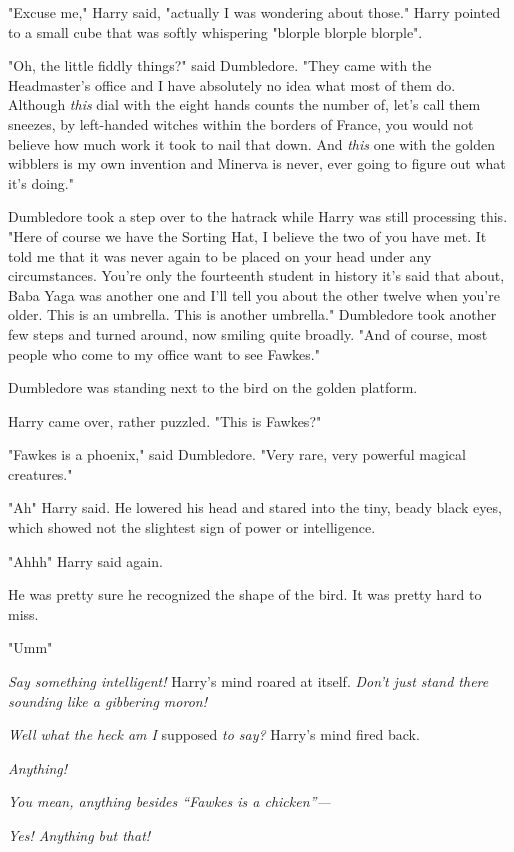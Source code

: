 "Excuse me," Harry said, "actually I was wondering about those." Harry pointed
to a small cube that was softly whispering "blorple{\el} blorple{\el}
blorple".

"Oh, the little fiddly things?" said Dumbledore. "They came with the
Headmaster's office and I have absolutely no idea what most of them do.
Although \emph{this} dial with the eight hands counts the number of, let's call
them sneezes, by left-handed witches within the borders of France, you would
not believe how much work it took to nail that down. And \emph{this} one with
the golden wibblers is my own invention and Minerva is never, ever going to
figure out what it's doing."

Dumbledore took a step over to the hatrack while Harry was still processing
this. "Here of course we have the Sorting Hat, I believe the two of you have
met. It told me that it was never again to be placed on your head under any
circumstances. You're only the fourteenth student in history it's said that
about, Baba Yaga was another one and I'll tell you about the other twelve when
you're older. This is an umbrella. This is another umbrella." Dumbledore took
another few steps and turned around, now smiling quite broadly. "And of course,
most people who come to my office want to see Fawkes."

Dumbledore was standing next to the bird on the golden platform.

Harry came over, rather puzzled. "This is Fawkes?"

"Fawkes is a phoenix," said Dumbledore. "Very rare, very powerful magical
creatures."

"Ah{\el}" Harry said. He lowered his head and stared into the tiny, beady
black eyes, which showed not the slightest sign of power or intelligence.

"Ahhh{\el}" Harry said again.

He was pretty sure he recognized the shape of the bird. It was pretty hard to
miss.

"Umm{\el}"

\emph{Say something intelligent!} Harry's mind roared at itself. \emph{Don't
just stand there sounding like a gibbering moron!}

\emph{Well what the heck am I} supposed \emph{to say?} Harry's mind fired back.

\emph{Anything!}

\emph{You mean, anything besides ``Fawkes is a chicken''---}

\emph{Yes! Anything but that!}

